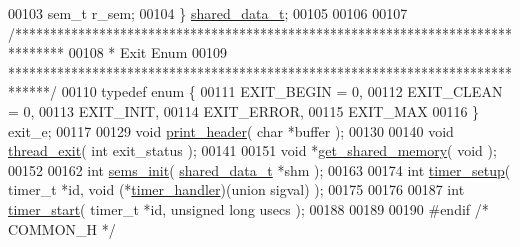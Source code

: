 \begin{DoxyCode}
00103    sem\_t r\_sem;
00104 \} \hyperlink{structshared__data__t}{shared\_data\_t};
00105 
00106 
00107 \textcolor{comment}{/*******************************************************************************}
00108 \textcolor{comment}{ *  Exit Enum}
00109 \textcolor{comment}{ ******************************************************************************/}
00110 \textcolor{keyword}{typedef} \textcolor{keyword}{enum} \{
00111    EXIT\_BEGIN = 0,
00112    EXIT\_CLEAN = 0,
00113    EXIT\_INIT,
00114    EXIT\_ERROR,
00115    EXIT\_MAX
00116 \} exit\_e;
00117 
00129 \textcolor{keywordtype}{void} \hyperlink{common_8h_a8f714d490a7f06c3a43cfea239e2770f}{print\_header}( \textcolor{keywordtype}{char} *buffer );
00130 
00140 \textcolor{keywordtype}{void} \hyperlink{common_8h_a760f8eb17501e01a6673e2ec911ba1cb}{thread\_exit}( \textcolor{keywordtype}{int} exit\_status );
00141 
00151 \textcolor{keywordtype}{void} *\hyperlink{common_8h_ae426f169cff2eb748a7d509bda02c686}{get\_shared\_memory}( \textcolor{keywordtype}{void} );
00152 
00162 \textcolor{keywordtype}{int} \hyperlink{common_8h_a8e1ee6092ec482d5556b2100d64b8c74}{sems\_init}( \hyperlink{structshared__data__t}{shared\_data\_t} *shm );
00163 
00174 \textcolor{keywordtype}{int} \hyperlink{common_8h_a7bc3784d4fdb323e1761a141c72d2f49}{timer\_setup}( timer\_t *\textcolor{keywordtype}{id}, \textcolor{keywordtype}{void} (*\hyperlink{light_8c_a4f3aa3fb3750262d938e191252db81fb}{timer\_handler})(\textcolor{keyword}{union} sigval) );
00175 
00176 
00187 \textcolor{keywordtype}{int} \hyperlink{common_8h_a207644f53334379d5fcb82b78bafff36}{timer\_start}( timer\_t *\textcolor{keywordtype}{id}, \textcolor{keywordtype}{unsigned} \textcolor{keywordtype}{long} usecs );
00188 
00189 
00190 \textcolor{preprocessor}{#endif }\textcolor{comment}{/* COMMON\_H */}\textcolor{preprocessor}{}
\end{DoxyCode}
